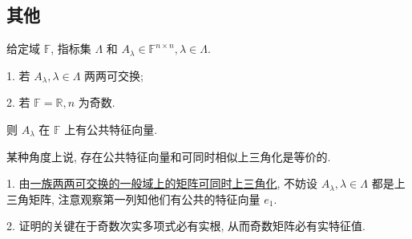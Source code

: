 \documentclass[../../main.tex]{subfiles}
\begin{document}
\subsection{其他}

\begin{theorem}[公共特征值]\label{theorem:公共特征值}
给定域 \( \mathbb{F} \), 指标集 \( \Lambda \) 和 \( A_\lambda \in \mathbb{F}^{n \times n}, \lambda \in \Lambda \).

1. 若 \( A_\lambda, \lambda \in \Lambda \) 两两可交换;

2. 若 \( \mathbb{F} = \mathbb{R}, n \) 为奇数.

则 \( A_\lambda \) 在 \( \mathbb{F} \) 上有公共特征向量.
\end{theorem}
\begin{note}
某种角度上说, 存在公共特征向量和可同时相似上三角化是等价的.

1. 由\hyperref[proposition:一族两两可交换的一般域上的矩阵可同时上三角化]{一族两两可交换的一般域上的矩阵可同时上三角化}, 不妨设 \( A_\lambda, \lambda \in \Lambda \) 都是上三角矩阵, 注意观察第一列知他们有公共的特征向量 \( e_1 \).

2. 证明的关键在于奇数次实多项式必有实根, 从而奇数矩阵必有实特征值.
\end{note}
\end{document}
